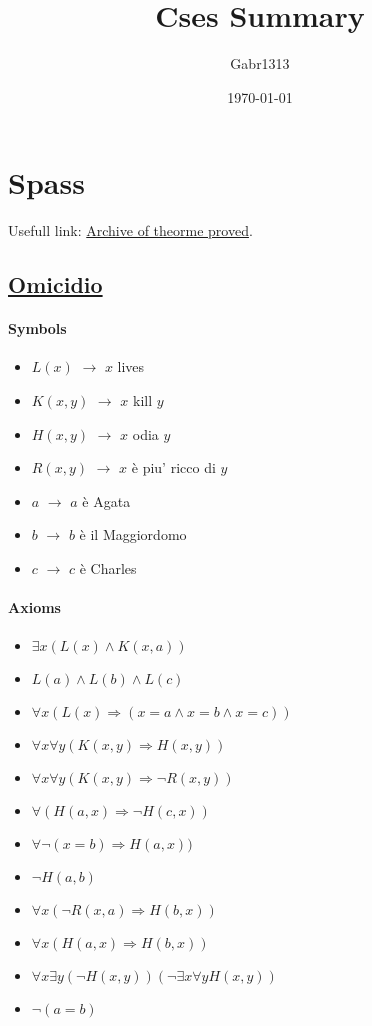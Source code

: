 \documentclass[12pt, a4paper]{report}
\title{Cses Summary}
\author{Gabr1313}
\date{\today}
\begin{document}
\justify

\maketitle
\tableofcontents

\chapter{Spass}
Usefull link: \href{https://www.tptp.org}{Archive of theorme proved}.
\section{\href{https://tptp.org/cgi-bin/SeeTPTP?Category=Problems&Domain=PUZ&File=PUZ001+1.p}{Omicidio}}
\subsubsection{Symbols}
\begin{itemize}
    \item $L(x)$ $\rightarrow$ $x$ lives
    \item $K(x,y)$ $\rightarrow$ $x$ kill $y$
    \item $H(x,y)$ $\rightarrow$ $x$ odia $y$
    \item $R(x,y)$ $\rightarrow$ $x$ è piu' ricco di $y$
    \item $a$ $\rightarrow$ $a$ è Agata
    \item $b$ $\rightarrow$ $b$ è il Maggiordomo
    \item $c$ $\rightarrow$ $c$ è Charles
\end{itemize}

\subsubsection{Axioms}
\begin{itemize}
    \item $\exists x(L(x) \wedge K(x,a)) $
    \item $L(a) \wedge L(b) \wedge L(c)$
    \item $\forall x(L(x) \Rightarrow (x = a \wedge x = b \wedge x = c)) $
    \item $\forall x \forall y (K(x,y) \Rightarrow H(x, y))$
    \item $\forall x \forall y (K(x,y) \Rightarrow \neg R(x, y))$
    \item $\forall (H(a,x) \Rightarrow \neg H(c,x))$
    \item $\forall \neg(x=b) \Rightarrow H(a,x))$
    \item $\neg H(a,b)$
    \item $\forall x (\neg R(x,a) \Rightarrow H(b,x))$
    \item $\forall x( H(a,x) \Rightarrow H(b,x))$
    \item $\forall x \exists y( \neg H(x,y)) (\neg \exists x \forall y H(x,y))$
    \item $\neg (a = b)$
\end{itemize}
\end{document}
